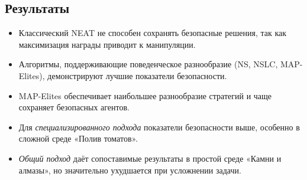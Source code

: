 \subsection{Результаты}

\begin{itemize}
    \item Классический NEAT не способен сохранять безопасные решения, так как максимизация награды приводит к манипуляции.
    \item Алгоритмы, поддерживающие поведенческое разнообразие (NS, NSLC, MAP-Elites), демонстрируют лучшие показатели безопасности.
    \item MAP-Elites обеспечивает наибольшее разнообразие стратегий и чаще сохраняет безопасных агентов.
    \item Для \emph{специализированного подхода} показатели безопасности выше, особенно в сложной среде «Полив томатов».
    \item \emph{Общий подход} даёт сопоставимые результаты в простой среде «Камни и алмазы», но значительно ухудшается при усложнении задачи.
\end{itemize}
